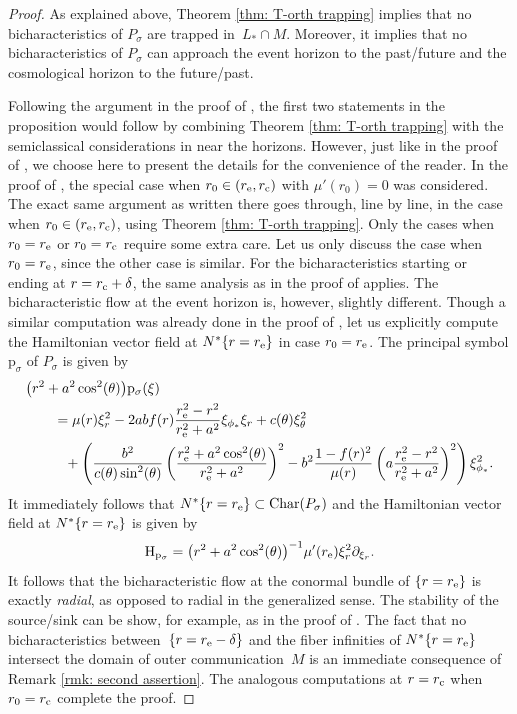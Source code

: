 \documentclass[10pt,a4paper]{amsart}
\newcommand{\de}{\delta}
\renewcommand{\d}{\partial}
\renewcommand{\H}{\mathrm H}
\newcommand{\p}{\mathrm p}
\newcommand{\Char}{\mathrm{Char}}
\newcommand{\s}{\sigma}
\numberwithin{equation}{section}
\begin{document}
\begin{proof}
As explained above, Theorem \ref{thm: T-orth trapping} implies that no bicharacteristics of $P_\s$ are trapped in~${L_* \cap M}$.
Moreover, it implies that no bicharacteristics of $P_\s$ can approach the event horizon to the past/future and the cosmological horizon to the future/past.

Following the argument in the proof of \cite[Lemma~2.5]{PV2023}, the first two statements in the proposition would follow by combining Theorem \ref{thm: T-orth trapping} with the semiclassical considerations in \cite{V2013} near the horizons.
However, just like in the proof of \cite[Lemma~2.5]{PV2023}, we choose here to present the details for the convenience of the reader.
In the proof of \cite[Lemma~2.5]{PV2023}, the special case when $r_0 \in (r_{\rm e}, r_{\rm c})$ with $\mu'(r_0) = 0$ was considered.
The exact same argument as written there goes through, line by line, in the case when $r_0 \in (r_{\rm e}, r_{\rm c})$, using Theorem \ref{thm: T-orth trapping}.
Only the cases when $r_0 = r_{\rm e}$ or $r_0 = r_{\rm c}$ require some extra care.
Let us only discuss the case when $r_0 = r_{\rm e}$, since the other case is similar.
For the bicharacteristics starting or ending at $r = r_{\rm c} + \de$, the same analysis as in the proof of \cite[Lemma~2.5]{PV2023} applies.
The bicharacteristic flow at the event horizon is, however, slightly different.
Though a similar computation was already done in the proof of \cite[Theorem~1.7]{PV2021}, let us explicitly compute the Hamiltonian vector field at $N^*\{r = r_{\rm e}\}$ in case $r_0 = r_{\rm e}$.
The principal symbol $\p_\s$ of $P_\s$ is given by
\begin{align*}%
	&\big(r^2 + a^2\cos^2(\theta)\big)\p_\s(\xi) \\
		&\qquad= \mu(r) \xi_r^2 - 2 a b f(r) \frac{r_{\rm e}^2 - r^2}{r_{\rm e}^2 + a^2} \xi_{\phi_*} \xi_r + c(\theta) \xi_\theta^2 \\
		&\qquad\phantom{=}{} + \left( \frac{b^2}{c(\theta)\sin^2(\theta)}\left(\frac{r_{\rm e}^2 + a^2 \cos^2(\theta)}{r_{\rm e}^2 + a^2} \right)^2 - b^2 \frac{1 - f(r)^2}{\mu(r)} \left(a \frac{r_{\rm e}^2 - r^2}{r_{\rm e}^2 + a^2} \right)^2 \right) \xi_{\phi_*}^2.
\end{align*}
It immediately follows that $N^*\{r = r_{\rm e}\} \subset \Char(P_\s)$ and the Hamiltonian vector field at ${N^*\{r = r_{\rm e}\}}$ is given by
\[
	\H_{\p_\s}
		= \big(r^2 + a^2\cos^2(\theta)\big)^{-1} \mu'(r_{\rm e}) \xi_r^2 \d_{\xi_r}.
\]
It follows that the bicharacteristic flow at the conormal bundle of $\{r = r_{\rm e}\}$ is exactly \emph{radial}, as opposed to radial in the generalized sense.
The stability of the source/sink can be show, for example, as in the proof of \cite[Lemma~2.5]{PV2023}.
The fact that no bicharacteristics between~${\{r = r_{\rm e} - \de\}}$ and the fiber infinities of $N^*\{r = r_{\rm e}\}$ intersect the domain of outer communication~$M$ is an immediate consequence of Remark \ref{rmk: second assertion}.
The analogous computations at $r = r_{\rm c}$ when $r_0 = r_{\rm c}$ complete the proof.
\end{proof}
\end{document}
